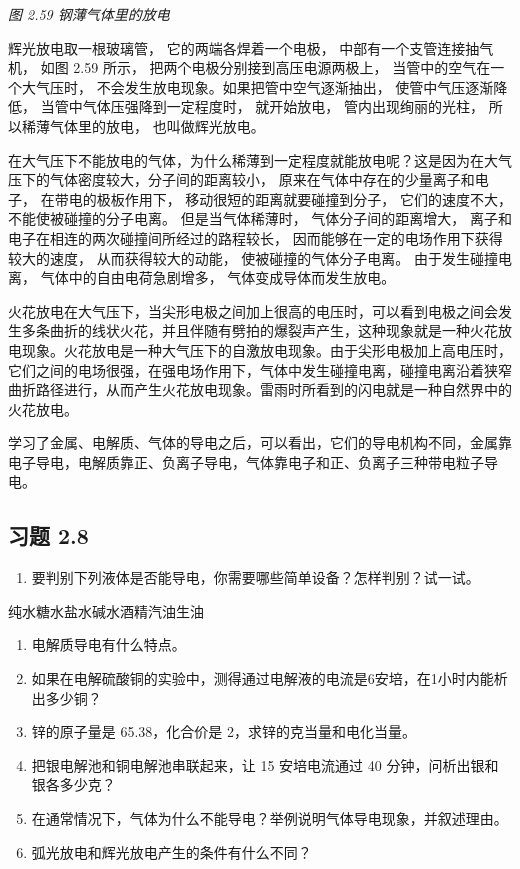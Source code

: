 \emph{图 2.59 钢薄气体里的放电}

辉光放电取一根玻璃管， 它的两端各焊着一个电极，
中部有一个支管连接抽气机， 如图 2.59 所示，
把两个电极分别接到高压电源两极上， 当管中的空气在一个大气压时，
不会发生放电现象。如果把管中空气逐渐抽出， 使管中气压逐渐降低，
当管中气体压强降到一定程度时， 就开始放电， 管内出现绚丽的光柱，
所以稀薄气体里的放电， 也叫做辉光放电。

在大气压下不能放电的气体，为什么稀薄到一定程度就能放电呢？这是因为在大气压下的气体密度较大，分子间的距离较小，
原来在气体中存在的少量离子和电子， 在带电的极板作用下，
移动很短的距离就要碰撞到分子， 它们的速度不大， 不能使被碰撞的分子电离。
但是当气体稀薄时， 气体分子间的距离增大，
离子和电子在相连的两次碰撞间所经过的路程较长，
因而能够在一定的电场作用下获得较大的速度， 从而获得较大的动能，
使被碰撞的气体分子电离。 由于发生碰撞电离， 气体中的自由电荷急剧增多，
气体变成导体而发生放电。

火花放电在大气压下，当尖形电极之间加上很高的电压时，可以看到电极之间会发生多条曲折的线状火花，并且伴随有劈拍的爆裂声产生，这种现象就是一种火花放电现象。火花放电是一种大气压下的自激放电现象。由于尖形电极加上高电压时，它们之间的电场很强，在强电场作用下，气体中发生碰撞电离，碰撞电离沿着狭窄曲折路径进行，从而产生火花放电现象。雷雨时所看到的闪电就是一种自然界中的火花放电。

学习了金属、电解质、气体的导电之后，可以看出，它们的导电机构不同，金属靠电子导电，电解质靠正、负离子导电，气体靠电子和正、负离子三种带电粒子导电。

\subsection{习题 2.8}\label{ux4e60ux9898-2.8}

\begin{enumerate}
\def\labelenumi{\arabic{enumi}.}
\tightlist
\item
  要判别下列液体是否能导电，你需要哪些简单设备？怎样判别？试一试。
\end{enumerate}

纯水糖水盐水碱水酒精汽油生油

\begin{enumerate}
\def\labelenumi{\arabic{enumi}.}
\setcounter{enumi}{1}
\item
  电解质导电有什么特点。
\item
  如果在电解硫酸铜的实验中，测得通过电解液的电流是6安培，在1小时内能析出多少铜？
\item
  锌的原子量是 65.38，化合价是 2，求锌的克当量和电化当量。
\item
  把银电解池和铜电解池串联起来，让 15 安培电流通过 40
  分钟，问析出银和银各多少克？
\item
  在通常情况下，气体为什么不能导电？举例说明气体导电现象，并叙述理由。
\item
  弧光放电和辉光放电产生的条件有什么不同？
\end{enumerate}


